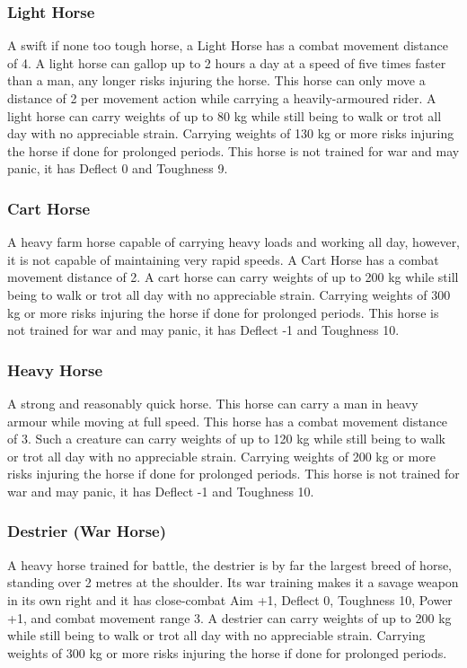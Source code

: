 \documentclass[a4paper,11pt,oneside]{book}
\begin{document}
\subsubsection*{Light Horse}
A swift if none too tough horse, a Light Horse has a combat movement distance of 4. A light horse can gallop up to 2 hours a day at a speed of five times faster than a man, any longer risks injuring the horse. This horse can only move a distance of 2 per movement action while carrying a heavily-armoured rider. A light horse can carry weights of up to 80 kg while still being to walk or trot all day with no appreciable strain. Carrying weights of 130 kg or more risks injuring the horse if done for prolonged periods. This horse is not trained for war and may panic, it has Deflect 0 and Toughness 9.

\subsubsection*{Cart Horse}
A heavy farm horse capable of carrying heavy loads and working all day, however, it is not capable of maintaining very rapid speeds. A Cart Horse has a combat movement distance of 2. A cart horse can carry weights of up to 200 kg while still being to walk or trot all day with no appreciable strain. Carrying weights of 300 kg or more risks injuring the horse if done for prolonged periods. This horse is not trained for war and may panic, it has Deflect -1 and Toughness 10.

\subsubsection*{Heavy Horse}
A strong and reasonably quick horse. This horse can carry a man in heavy armour while moving at full speed. This horse has a combat movement distance of 3. Such a creature can carry weights of up to 120 kg while still being to walk or trot all day with no appreciable strain. Carrying weights of 200 kg or more risks injuring the horse if done for prolonged periods. This horse is not trained for war and may panic, it has Deflect -1 and Toughness 10.

\subsubsection*{Destrier (War Horse)}
A heavy horse trained for battle, the destrier is by far the largest breed of horse, standing over 2 metres at the shoulder. Its war training makes it a savage weapon in its own right and it has close-combat Aim +1, Deflect 0, Toughness 10, Power +1, and combat movement range 3. A destrier can carry weights of up to 200 kg while still being to walk or trot all day with no appreciable strain. Carrying weights of 300 kg or more risks injuring the horse if done for prolonged periods.
\end{document}
